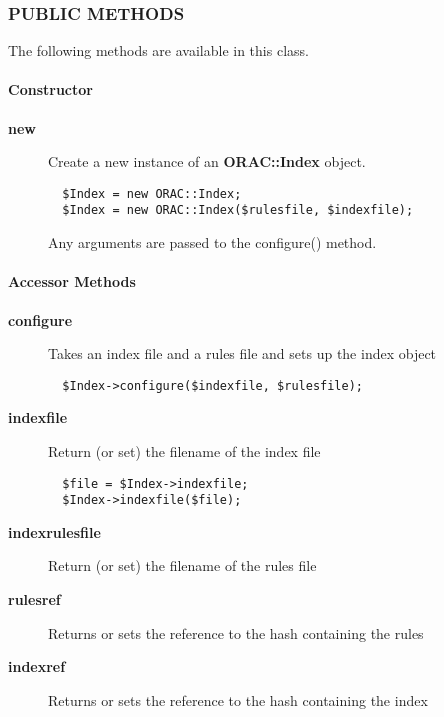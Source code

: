 \subsubsection*{PUBLIC METHODS\label{ORAC::Index_PUBLIC_METHODS}}

The following methods are available in this class.

\paragraph*{Constructor\label{ORAC::Index_Constructor}}\begin{description}
\item[\textbf{new}] \mbox{}

Create a new instance of an \textbf{ORAC::Index} object.

\begin{verbatim}
  $Index = new ORAC::Index;
  $Index = new ORAC::Index($rulesfile, $indexfile);
\end{verbatim}


Any arguments are passed to the configure() method.

\end{description}
\paragraph*{Accessor Methods\label{ORAC::Index_Accessor_Methods}}\begin{description}
\item[\textbf{configure}] \mbox{}

Takes an index file and a rules file and sets up the index object

\begin{verbatim}
  $Index->configure($indexfile, $rulesfile);
\end{verbatim}
\item[\textbf{indexfile}] \mbox{}

Return (or set) the filename of the index file

\begin{verbatim}
  $file = $Index->indexfile;
  $Index->indexfile($file);
\end{verbatim}
\item[\textbf{indexrulesfile}] \mbox{}

Return (or set) the filename of the rules file

\item[\textbf{rulesref}] \mbox{}

Returns or sets the reference to the hash containing the rules

\item[\textbf{indexref}] \mbox{}

Returns or sets the reference to the hash containing the index

\end{description}
